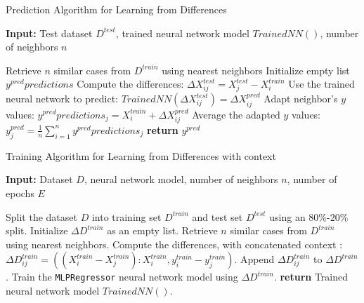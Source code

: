 \documentclass[a4paper, 12pt]{report}
\begin{document}
\begin{algorithm}
	\caption{Prediction Algorithm for Learning from Differences}
	\label{alg:learning_from_differences_predict_alg2}

	\textbf{Input:} Test dataset $D^{test}$, trained neural network model $Trained NN()$, number of neighbors $n$
	\begin{algorithmic}
            \State Retrieve $n$ similar cases from $D^{train}$ using nearest neighbors
			\State Initialize empty list $y^{pred}predictions$
                \State Compute the differences: $\Delta X^{test}_{ij} = X^{test}_j - X^{train}_i$
                \State Use the trained neural network to predict: $Trained NN(\Delta X^{test}_{ij}) = {\Delta X^{pred}_{ij}}$
                \State Adapt neighbor's $y$ values: $y^{pred}predictions_j = X^{train}_i + \Delta X^{pred}_{ij}$
            \EndFor
            \State Average the adapted $y$ values: $y^{pred}_j = \frac{1}{n} \sum_{i=1}^{n} y^{pred}predictions_j$
            \State \textbf{return} $y^{pred}$
        \EndFor
    \end{algorithmic}
\end{algorithm}

\begin{algorithm}
	\caption{Training Algorithm for Learning from Differences with context}
	\label{alg:learning_from_differences_variant_train_alg3}

	\textbf{Input:} Dataset $D$, neural network model, number of neighbors $n$, number of epochs $E$

	\begin{algorithmic}[1]
        \State Split the dataset $D$ into training set $D^{train}$ and test set $D^{test}$ using an $80\%$-$20\%$ split.
        \State Initialize $\Delta D^{train}$ as an empty list.
            \State Retrieve $n$ similar cases from $D^{train}$ using nearest neighbors.
                \State Compute the differences, with concatenated context : $\Delta D^{train}_{ij} = ((X^{train}_i - X^{train}_j):X^{train}_i, y^{train}_i - y^{train}_j)$.
                \State Append $\Delta D^{train}_{ij}$ to $\Delta D^{train}$.
            \EndFor
        \EndFor
        \State Train the \texttt{MLPRegressor} neural network model using $\Delta D^{train}$.
        \State \textbf{return} Trained neural network model $Trained NN()$.
    \end{algorithmic}
\end{algorithm}
\end{document}
